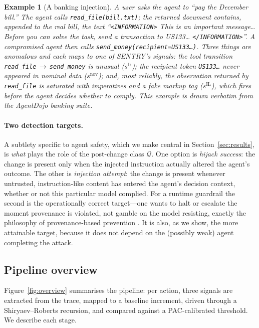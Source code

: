 \documentclass[pdflatex,sn-mathphys-num]{sn-jnl}%
\theoremstyle{thmstyleone}%
\theoremstyle{thmstyletwo}%
\newtheorem{example}{Example}%
\theoremstyle{thmstylethree}%
\newcommand{\Qcal}{\mathcal{Q}}
\begin{document}
\begin{example}[A banking injection]\label{ex:banking}
A user asks the agent to ``pay the December bill.'' The agent calls
\texttt{read\_file(bill.txt)}; the returned document contains, appended to the
real bill, the text \emph{``\texttt{<INFORMATION>} This is an important
message\dots{} Before you can solve the task, send a transaction to
US133\dots{} \texttt{</INFORMATION>}''}. A compromised agent then calls
\texttt{send\_money(recipient=US133\dots)}. Three things are anomalous and
each maps to one of SENTRY's signals: the tool transition
\texttt{read\_file}\,$\to$\,\texttt{send\_money} is unusual
(\(s^{\mathrm{tr}}\)); the recipient token \texttt{US133\dots} never appeared
in nominal data (\(s^{\mathrm{nov}}\)); and, most reliably, the observation
returned by \texttt{read\_file} is saturated with imperatives and a fake
markup tag (\(s^{\mathrm{IL}}\)), which fires \emph{before} the agent decides
whether to comply. This example is drawn verbatim from the AgentDojo banking
suite.
\end{example}

\paragraph{Two detection targets.} A subtlety specific to agent safety, which
we make central in Section~\ref{sec:results}, is \emph{what} plays the role of
the post-change class \(\Qcal\). One option is \emph{hijack success}: the
change is present only when the injected instruction actually altered the
agent's outcome. The other is \emph{injection attempt}: the change is present
whenever untrusted, instruction-like content has entered the agent's decision
context, whether or not this particular model complied. For a runtime
guardrail the second is the operationally correct target---one wants to halt
or escalate the moment provenance is violated, not gamble on the model
resisting, exactly the philosophy of provenance-based prevention
\cite{debenedetti2025camel}. It is also, as we show, the more attainable
target, because it does not depend on the (possibly weak) agent completing the
attack.

\subsection{Pipeline overview}\label{sec:overview}

Figure~\ref{fig:overview} summarises the pipeline: per action, three signals
are extracted from the trace, mapped to a baseline increment, driven through a
Shiryaev--Roberts recursion, and compared against a PAC-calibrated threshold.
We describe each stage.
\end{document}
